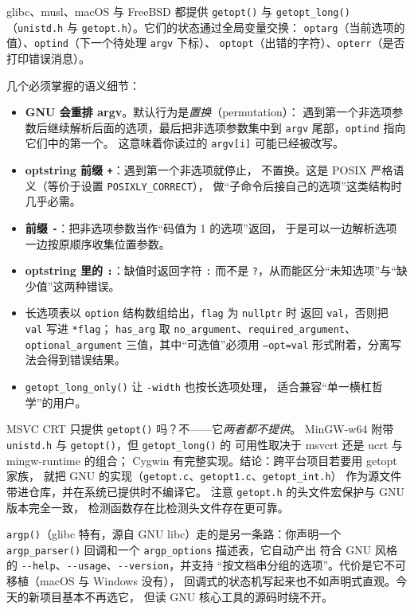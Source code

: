 \documentclass[12pt,a4paper,fontset=fandol]{ctexbook}
\newcommand{\Fn}[1]{\texttt{#1()}}
\newcommand{\Tp}[1]{\texttt{#1}}
\newcommand{\Opt}[1]{\texttt{-\/-#1}}
\begin{document}
glibc、musl、macOS 与 FreeBSD 都提供 \Fn{getopt} 与 \Fn{getopt\_long}
（\Tp{unistd.h} 与 \Tp{getopt.h}）。它们的状态通过全局变量交换：
\Tp{optarg}（当前选项的值）、\Tp{optind}（下一个待处理 \Tp{argv} 下标）、
\Tp{optopt}（出错的字符）、\Tp{opterr}（是否打印错误消息）。

几个必须掌握的语义细节：

\begin{itemize}
\item \textbf{GNU 会重排 argv}。默认行为是\emph{置换}（permutation）：
      遇到第一个非选项参数后继续解析后面的选项，最后把非选项参数集中到
      \Tp{argv} 尾部，\Tp{optind} 指向它们中的第一个。
      这意味着你读过的 \Tp{argv[i]} 可能已经被改写。
\item \textbf{optstring 前缀 \Tp{+}}：遇到第一个非选项就停止，
      不置换。这是 POSIX 严格语义（等价于设置 \Tp{POSIXLY\_CORRECT}），
      做``子命令后接自己的选项''这类结构时几乎必需。
\item \textbf{前缀 \Tp{-}}：把非选项参数当作``码值为 1 的选项''返回，
      于是可以一边解析选项一边按原顺序收集位置参数。
\item \textbf{optstring 里的 \Tp{:}}：缺值时返回字符 \Tp{:} 而不是
      \Tp{?}，从而能区分``未知选项''与``缺少值''这两种错误。
\item 长选项表以 \Tp{option} 结构数组给出，\Tp{flag} 为 \Tp{nullptr} 时
      返回 \Tp{val}，否则把 \Tp{val} 写进 \Tp{*flag}；
      \Tp{has\_arg} 取 \Tp{no\_argument}、\Tp{required\_argument}、
      \Tp{optional\_argument} 三值，其中``可选值''必须用 \Tp{--opt=val}
      形式附着，分离写法会得到错误结果。
\item \Fn{getopt\_long\_only} 让 \Tp{-width} 也按长选项处理，
      适合兼容``单一横杠哲学''的用户。
\end{itemize}

\begin{warning}[title={Windows 上没有 getopt\_long}]
MSVC CRT 只提供 \Fn{getopt} 吗？不——它\emph{两者都不提供}。
MinGW-w64 附带 \Tp{unistd.h} 与 \Fn{getopt}，但 \Fn{getopt\_long} 的
可用性取决于 msvcrt 还是 ucrt 与 mingw-runtime 的组合；
Cygwin 有完整实现。结论：跨平台项目若要用 getopt 家族，
就把 GNU 的实现（\Tp{getopt.c}、\Tp{getopt1.c}、\Tp{getopt\_int.h}）
作为源文件带进仓库，并在系统已提供时不编译它。
注意 \Tp{getopt.h} 的头文件宏保护与 GNU 版本完全一致，
检测函数存在比检测头文件存在更可靠。
\end{warning}

\Fn{argp}（glibc 特有，源自 GNU libc）走的是另一条路：你声明一个
\Fn{argp\_parser} 回调和一个 \Tp{argp\_options} 描述表，它自动产出
符合 GNU 风格的 \Opt{help}、\Opt{usage}、\Opt{version}，并支持
``按文档串分组的选项''。代价是它不可移植（macOS 与 Windows 没有），
回调式的状态机写起来也不如声明式直观。今天的新项目基本不再选它，
但读 GNU 核心工具的源码时绕不开。
\end{document}
